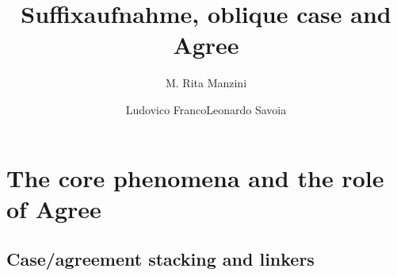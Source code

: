 \documentclass[output=paper]{langsci/langscibook}
\author{M. Rita Manzini\affiliation{Università degli Studi di Firenze}\and Ludovico Franco\affiliation{Università degli Studi di Firenze}\lastand Leonardo Savoia\affiliation{Università degli Studi di Firenze}}
\title{Suffixaufnahme, oblique case and Agree}
\begin{document}
 

 

 

 

 

 

 

 

 

 

 

\section{The core phenomena and the role of Agree}%
\subsection{Case/agreement stacking and linkers} %
\end{document}
